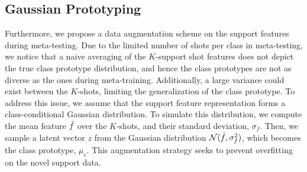 \documentclass[10pt,twocolumn,letterpaper]{article}
\begin{document}
\subsection{Gaussian Prototyping}
Furthermore, we propose a data augmentation scheme on the support features during meta-testing. Due to the limited number of shots per class in meta-testing, we notice that a naive averaging of the $K$-support shot features does not depict the true class prototype distribution, and hence the class prototypes are not as diverse as the ones during meta-training. Additionally, a large variance could exist between the $K$-shots, limiting the generalization of the class prototype. To address this issue, we assume that the support feature representation forms a class-conditional Gaussian distribution. To simulate this distribution, we compute the mean feature $\Bar{f}$ over the $K$-shots, and their standard deviation, $\sigma_f$. Then, we sample a latent vector $z$ from the Gaussian distribution $\mathcal{N}(\Bar{f}, \sigma_f^2)$, which becomes the class prototype, $\mu_c$. This augmentation strategy seeks to prevent overfitting on the novel support data. 
\end{document}
